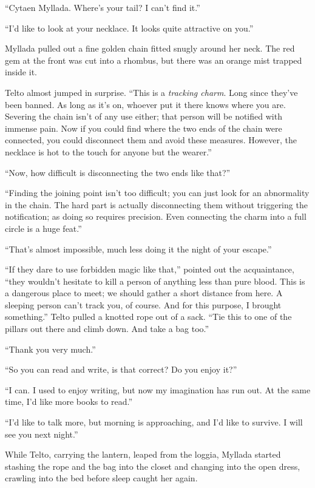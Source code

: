 ``Cytaen Myllada. Where's your tail? I can't find it.''

``I'd like to look at your necklace. It looks quite attractive on you.''

Myllada pulled out a fine golden chain fitted snugly around her neck. The red gem at the front was cut into a rhombus, but there was an orange mist trapped inside it.

Telto almost jumped in surprise. ``This is a \emph{tracking charm}. Long since they've been banned. As long as it's on, whoever put it there knows where you are. Severing the chain isn't of any use either; that person will be notified with immense pain. Now if you could find where the two ends of the chain were connected, you could disconnect them and avoid these measures. However, the necklace is hot to the touch for anyone but the wearer.''

``Now, how difficult is disconnecting the two ends like that?''

``Finding the joining point isn't too difficult; you can just look for an abnormality in the chain. The hard part is actually disconnecting them without triggering the notification; as doing so requires precision. Even connecting the charm into a full circle is a huge feat.''

``That's almost impossible, much less doing it the night of your escape.''

``If they dare to use forbidden magic like that,'' pointed out the acquaintance, ``they wouldn't hesitate to kill a person of anything less than pure blood. This is a dangerous place to meet; we should gather a short distance from here. A sleeping person can't track you, of course. And for this purpose, I brought something.'' Telto pulled a knotted rope out of a sack. ``Tie this to one of the pillars out there and climb down. And take a bag too.''

``Thank you very much.''

``So you can read and write, is that correct? Do you enjoy it?''

``I can. I used to enjoy writing, but now my imagination has run out. At the same time, I'd like more books to read.''

``I'd like to talk more, but morning is approaching, and I'd like to survive. I will see you next night.''

While Telto, carrying the lantern, leaped from the loggia, Myllada started stashing the rope and the bag into the closet and changing into the open dress, crawling into the bed before sleep caught her again.

